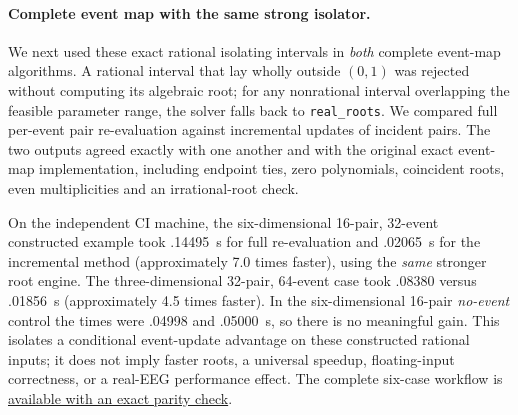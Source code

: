 \paragraph{Complete event map with the same strong isolator.}
We next used these exact rational isolating intervals in \emph{both}
complete event-map algorithms. A rational interval that lay wholly
outside $(0,1)$ was rejected without computing its algebraic root;
for any nonrational interval overlapping the feasible parameter range,
the solver falls back to \texttt{real\_roots}. We compared full
per-event pair re-evaluation against incremental updates of incident
pairs. The two outputs agreed exactly with one another and with the
original exact event-map implementation, including endpoint ties,
zero polynomials, coincident roots, even multiplicities and an
irrational-root check.

On the independent CI machine, the six-dimensional 16-pair,
32-event constructed example took .14495~s for full re-evaluation
and .02065~s for the incremental method (approximately 7.0 times
faster), using the \emph{same} stronger root engine. The
three-dimensional 32-pair, 64-event case took .08380 versus
.01856~s (approximately 4.5 times faster). In the six-dimensional
16-pair \emph{no-event} control the times were .04998 and
.05000~s, so there is no meaningful gain. This isolates a
conditional event-update advantage on these constructed rational
inputs; it does not imply faster roots, a universal speedup,
floating-input correctness, or a real-EEG performance effect. The
complete six-case workflow is
\href{https://github.com/lindicaphxag-tech/kaggle/actions/runs/38364906164}{available with an exact parity check}.
